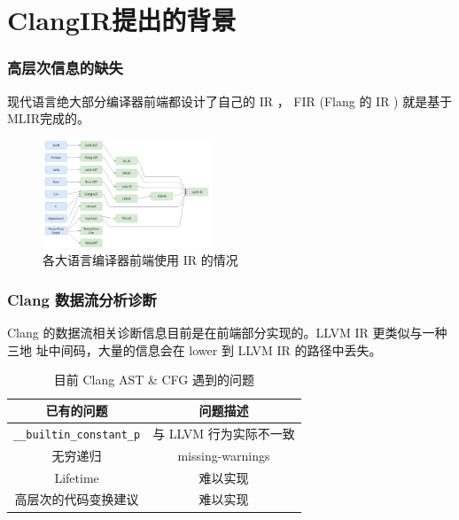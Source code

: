 \section{ClangIR提出的背景}

\begin{frame}
    \frametitle{高层次信息的缺失}
    现代语言绝大部分编译器前端都设计了自己的 IR ， FIR (Flang 的 IR ) 就是基于
    MLIR完成的。
    \begin{figure}[h]
        \centering
        \includegraphics[width=0.45\textwidth]{images/compiler-ir.png}
        \caption{各大语言编译器前端使用 IR 的情况}
    \end{figure}

\end{frame}

\begin{frame}
    \frametitle{Clang 数据流分析诊断}

    Clang 的数据流相关诊断信息目前是在前端部分实现的。LLVM IR 更类似与一种三地
    址中间码，大量的信息会在 lower 到 LLVM IR 的路径中丢失。

    \begin{table}
        \centering
        \begin{tabular}{cc}
            \toprule
            已有的问题                             & 问题描述                                             \\
            \midrule
            \texttt{\_\_builtin\_constant\_p} & 与 LLVM 行为实际不一致\cite{aaronballman-constantp-2019} \\
            无穷递归                              & missing-warnings\cite{aaronballman-infrec-2019}  \\
            Lifetime                          & 难以实现                                             \\
            高层次的代码变换建议                        & 难以实现                                             \\
            \bottomrule
        \end{tabular}
        \caption{目前 Clang AST \& CFG 遇到的问题}
    \end{table}
    \label{tab:clang_diag}
\end{frame}

